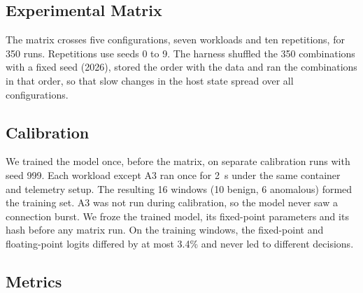 \subsection{Experimental Matrix}

The matrix crosses five configurations, seven workloads and ten repetitions, for 350 runs. Repetitions use seeds 0 to 9. The harness shuffled the 350 combinations with a fixed seed (2026), stored the order with the data and ran the combinations in that order, so that slow changes in the host state spread over all configurations.

\subsection{Calibration}

We trained the model once, before the matrix, on separate calibration runs with seed 999. Each workload except A3 ran once for 2~s under the same container and telemetry setup. The resulting 16 windows (10 benign, 6 anomalous) formed the training set. A3 was not run during calibration, so the model never saw a connection burst. We froze the trained model, its fixed-point parameters and its hash before any matrix run. On the training windows, the fixed-point and floating-point logits differed by at most 3.4\% and never led to different decisions.

\subsection{Metrics}

